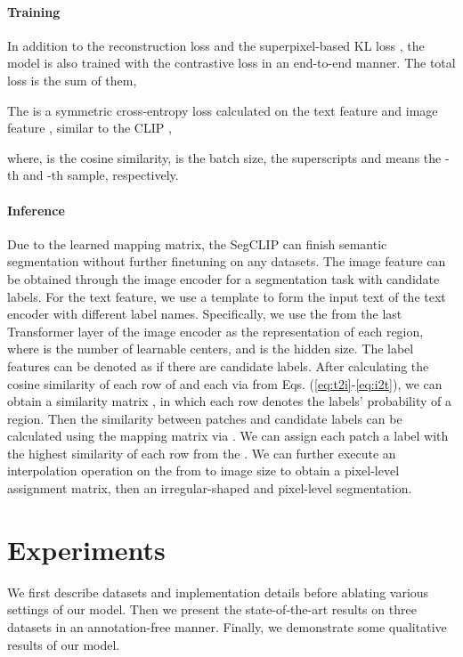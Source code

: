\documentclass{article}
\theoremstyle{plain}
\theoremstyle{definition}
\theoremstyle{remark}
\begin{document}
\paragraph{Training}
In addition to the reconstruction loss  and the superpixel-based KL loss , the model is also trained with the contrastive loss  in an end-to-end manner. The total loss is the sum of them,


The  is a symmetric cross-entropy loss calculated on the text feature  and image feature , similar to the CLIP \cite{Radford2021Learning},

where,  is the cosine similarity,  is the batch size, the superscripts  and  means the -th and -th sample, respectively.

\paragraph{Inference} Due to the learned mapping matrix, the SegCLIP can finish semantic segmentation without further finetuning on any datasets. The image feature can be obtained through the image encoder for a segmentation task with candidate labels. For the text feature, we use a template  to form the input text of the text encoder with different label names. Specifically, we use the  from the last Transformer layer of the image encoder as the representation of each region, where  is the number of learnable centers, and  is the hidden size. The label features can be denoted as  if there are  candidate labels. After calculating the cosine similarity of each row of  and each  via  from Eqs. (\ref{eq:t2i}-\ref{eq:i2t}), we can obtain a similarity matrix , in which each row denotes the labels' probability of a region. Then the similarity  between patches and candidate labels can be calculated using the mapping matrix  via . We can assign each patch a label with the highest similarity of each row from the . We can further execute an interpolation operation on the  from  to image size to obtain a pixel-level assignment matrix, then an irregular-shaped and pixel-level segmentation.

\section{Experiments}
\label{sec_experiments}
We first describe datasets and implementation details before ablating various settings of our model. Then we present the state-of-the-art results on three datasets in an annotation-free manner. Finally, we demonstrate some qualitative results of our model.
\end{document}
